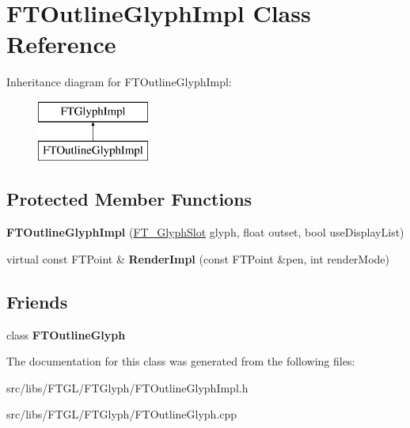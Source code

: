 \hypertarget{class_f_t_outline_glyph_impl}{
\section{FTOutlineGlyphImpl Class Reference}
\label{class_f_t_outline_glyph_impl}
}
Inheritance diagram for FTOutlineGlyphImpl:\begin{figure}[H]
\begin{center}
\leavevmode
\includegraphics[height=2.000000cm]{class_f_t_outline_glyph_impl}
\end{center}
\end{figure}
\subsection*{Protected Member Functions}
\begin{DoxyCompactItemize}
\item 
\hypertarget{class_f_t_outline_glyph_impl_a0eac191ec3db6c8dbbf6956ded4342fa}{
{\bfseries FTOutlineGlyphImpl} (\hyperlink{struct_f_t___glyph_slot_rec__}{FT\_\-GlyphSlot} glyph, float outset, bool useDisplayList)}
\label{class_f_t_outline_glyph_impl_a0eac191ec3db6c8dbbf6956ded4342fa}

\item 
\hypertarget{class_f_t_outline_glyph_impl_a554ed38dfe9a113804394c35e9ef9d35}{
virtual const FTPoint \& {\bfseries RenderImpl} (const FTPoint \&pen, int renderMode)}
\label{class_f_t_outline_glyph_impl_a554ed38dfe9a113804394c35e9ef9d35}

\end{DoxyCompactItemize}
\subsection*{Friends}
\begin{DoxyCompactItemize}
\item 
\hypertarget{class_f_t_outline_glyph_impl_accb6ff0274a52a67e706edda49d6a201}{
class {\bfseries FTOutlineGlyph}}
\label{class_f_t_outline_glyph_impl_accb6ff0274a52a67e706edda49d6a201}

\end{DoxyCompactItemize}


The documentation for this class was generated from the following files:\begin{DoxyCompactItemize}
\item 
src/libs/FTGL/FTGlyph/FTOutlineGlyphImpl.h\item 
src/libs/FTGL/FTGlyph/FTOutlineGlyph.cpp\end{DoxyCompactItemize}
